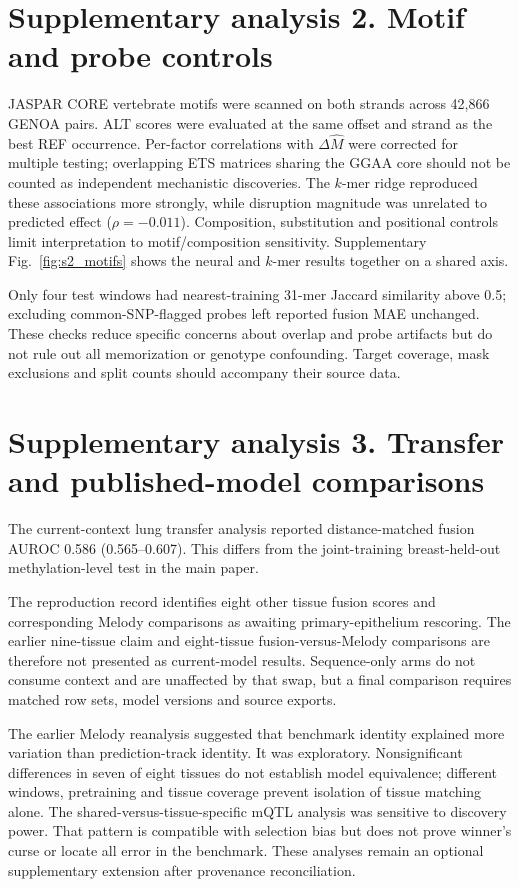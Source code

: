 \documentclass[10pt]{article}
\begin{document}
\section*{Supplementary analysis 2. Motif and probe controls}
JASPAR CORE vertebrate motifs were scanned on both strands across 42,866 GENOA pairs. ALT scores were evaluated at the same offset and strand as the best REF occurrence. Per-factor correlations with $\Delta\widehat M$ were corrected for multiple testing; overlapping ETS matrices sharing the GGAA core should not be counted as independent mechanistic discoveries. The $k$-mer ridge reproduced these associations more strongly, while disruption magnitude was unrelated to predicted effect ($\rho=-0.011$). Composition, substitution and positional controls limit interpretation to motif/composition sensitivity. Supplementary Fig.~\ref{fig:s2_motifs} shows the neural and $k$-mer results together on a shared axis.

Only four test windows had nearest-training 31-mer Jaccard similarity above 0.5; excluding common-SNP-flagged probes left reported fusion MAE unchanged. These checks reduce specific concerns about overlap and probe artifacts but do not rule out all memorization or genotype confounding. Target coverage, mask exclusions and split counts should accompany their source data.

\section*{Supplementary analysis 3. Transfer and published-model comparisons}
The current-context lung transfer analysis reported distance-matched fusion AUROC 0.586 (0.565--0.607). This differs from the joint-training breast-held-out methylation-level test in the main paper.

The reproduction record identifies eight other tissue fusion scores and corresponding Melody comparisons as awaiting primary-epithelium rescoring. The earlier nine-tissue claim and eight-tissue fusion-versus-Melody comparisons are therefore not presented as current-model results. Sequence-only arms do not consume context and are unaffected by that swap, but a final comparison requires matched row sets, model versions and source exports.

The earlier Melody reanalysis suggested that benchmark identity explained more variation than prediction-track identity. It was exploratory. Nonsignificant differences in seven of eight tissues do not establish model equivalence; different windows, pretraining and tissue coverage prevent isolation of tissue matching alone. The shared-versus-tissue-specific mQTL analysis was sensitive to discovery power. That pattern is compatible with selection bias but does not prove winner's curse or locate all error in the benchmark. These analyses remain an optional supplementary extension after provenance reconciliation.
\end{document}
